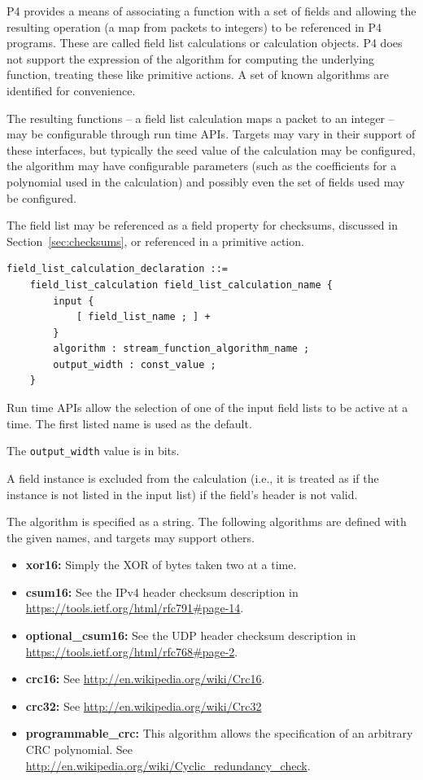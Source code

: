 \documentclass[12pt]{article}
\begin{document}
P4 provides a means of associating a function with a set of fields and
allowing the resulting operation (a map from packets to integers) to
be referenced in P4 programs.  These are called field list
calculations or calculation objects.  P4 does not support the
expression of the algorithm for computing the underlying function,
treating these like primitive actions. A set of known algorithms are
identified for convenience.

The resulting functions -- a field list calculation maps a packet to
an integer -- may be configurable through run time APIs. Targets may
vary in their support of these interfaces, but typically the seed
value of the calculation may be configured, the algorithm may have
configurable parameters (such as the coefficients for a polynomial
used in the calculation) and possibly even the set of fields used may
be configured.

The field list may be referenced as a field property for checksums,
discussed in Section~\ref{sec:checksums}, or referenced in a primitive action.

\begin{lstlisting}[style=BNFstyle]
field_list_calculation_declaration ::=
    field_list_calculation field_list_calculation_name {
        input {
            [ field_list_name ; ] +
        }
        algorithm : stream_function_algorithm_name ;
        output_width : const_value ;
    }
\end{lstlisting}

Run time APIs allow the selection of one of the input field lists to
be active at a time. The first listed name is used as the default.

The \texttt{output_width} value is in bits.

A field instance is excluded from the calculation (i.e., it is treated as 
if the instance is not listed in the input list) if the field's header 
is not valid.

The algorithm is specified as a string.  The following algorithms are
defined with the given names, and targets may support others.

\begin{itemize}
\item
\textbf{xor16:} Simply the XOR of bytes taken two at a time.
\item
\textbf{csum16:} See the IPv4 header checksum description in \\
\url{https://tools.ietf.org/html/rfc791\#page-14}.
\item
\textbf{optional_csum16:} See the UDP header checksum description in \\
\url{https://tools.ietf.org/html/rfc768#page-2}.
\item
\textbf{crc16:} See \url{http://en.wikipedia.org/wiki/Crc16}.
\item
\textbf{crc32:} See \url{http://en.wikipedia.org/wiki/Crc32}
\item
\textbf{programmable_crc:}  This algorithm allows the specification 
of an arbitrary CRC polynomial.  See
\url{http://en.wikipedia.org/wiki/Cyclic_redundancy_check}.
\end{itemize}
\end{document}
